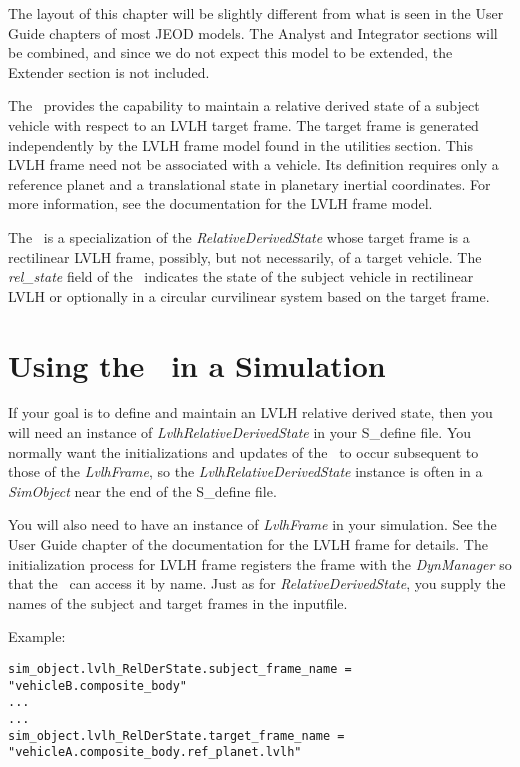 %
%
% 
%
The layout of this chapter will be slightly different from
what is seen in the User Guide chapters
of most JEOD models. The Analyst and Integrator sections will be combined, and
since we do not expect this model to be extended, the Extender section is not
included.

The \LRDSDesc\ provides the capability to maintain a relative derived state
of a subject vehicle with respect to an LVLH target frame. The target frame
is generated independently by the LVLH frame model found in the utilities
section. This LVLH frame need not be associated with a
vehicle. Its definition requires only a reference planet and a translational
state in planetary inertial coordinates. For more information, see the
documentation for the LVLH frame model.

The \LRDSDesc\ is a specialization of the \textit{RelativeDerivedState} whose
target frame is a rectilinear LVLH frame, possibly, but not necessarily, of a
target vehicle. The \textit{rel\_state} field of the \LRDSDesc\ indicates the
state of the subject vehicle in rectilinear LVLH or optionally in
a circular curvilinear system based on the target frame.
\section{Using the \LRDSDesc\ in a Simulation}
If your goal is to define and maintain an LVLH relative derived state, then
you will need an instance of \textit{LvlhRelativeDerivedState} in
your S\_define file. You normally want the initializations and updates of
the \LRDSDesc\ to occur subsequent to those of the \textit{LvlhFrame}, so
the \textit{LvlhRelativeDerivedState} instance is often
in a \textit{SimObject} near the end of the S\_define file.

You will also need to have an instance of \textit{LvlhFrame} in your simulation.
See the User Guide chapter of the documentation for the LVLH frame for details.
The initialization process for LVLH frame registers the frame with the
\textit{DynManager} so that the \LRDSDesc\ can access it by name.
Just as for \textit{RelativeDerivedState}, you supply the names of the
subject and target frames in the inputfile.

Example:
\begin{verbatim}
sim_object.lvlh_RelDerState.subject_frame_name =
"vehicleB.composite_body"
...
...
sim_object.lvlh_RelDerState.target_frame_name =
"vehicleA.composite_body.ref_planet.lvlh"
\end{verbatim}

